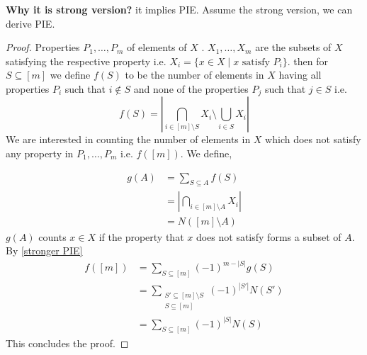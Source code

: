 \textbf{Why it is strong version?} it implies PIE.
Assume the strong version, we can derive PIE.
\begin{proof}
  Properties $P_1,\dots, P_m$ of elements of $X$ . $X_1,\dots, X_m$ are the subsets of $X$ satisfying the respective property i.e. $X_i=\{ x\in X \mid x \text{ satisfy } P_i\}$.
  then for $S \subseteq [m]$  we define $f(S)$ to be the number of elements in $X$ having all properties $P_i$ such that $i \notin S$ and none of the properties $P_j$ such that $ j \in S$ i.e.
  \[ f(S) = \left| \bigcap_{i\in [m] \setminus S} X_i \setminus \bigcup_{i\in S} X_i \right| \]
  We are interested in counting the number of elements in $X$ which does not satisfy any property in $P_1,\dots, P_m$ i.e. $f([m])$. We define,

  \begin{align*}
    g(A) & = \sum_{S\subseteq A} f(S)                         \\
         & = \left| \bigcap_{i \in [m] \setminus A}X_i\right| \\
         & = N([m]\setminus A)
  \end{align*}
  $g(A)$ counts $x\in X$ if the property that $x$ does not satisfy forms a subset of $A$. By \ref{stronger PIE}
  \begin{align*}
    f([m]) & = \sum_{S\subseteq [m]}(-1)^{m-|S|} g(S) \\
           & = \sum_{\substack{
    S'\subseteq [m]\setminus S                        \\
        S\subseteq [m]}}
    (-1)^{|S'|} N(S')                                 \\
           & = \sum_{S \subseteq [m]} (-1)^{|S|} N(S)
  \end{align*}
  This concludes the proof.
\end{proof}



